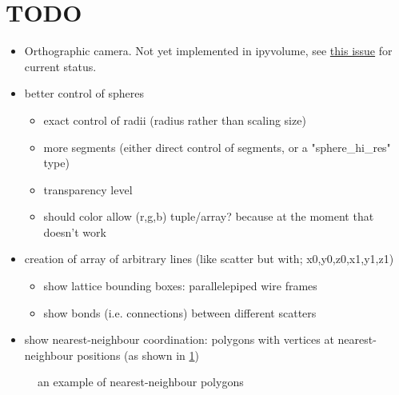 \documentclass[10pt,parskip=half,
	toc=sectionentrywithdots,
	bibliography=totocnumbered,
	captions=tableheading,numbers=noendperiod]{scrartcl}
\providecommand{\tightlist}{%
  \setlength{\itemsep}{0pt}\setlength{\parskip}{0pt}}
\begin{document}
\section{TODO}\label{todo}

\begin{itemize}
\tightlist
\item
  Orthographic camera. Not yet implemented in ipyvolume, see
  \href{https://github.com/maartenbreddels/ipyvolume/issues/31}{this
  issue} for current status.
\item
  better control of spheres

  \begin{itemize}
  \tightlist
  \item
    exact control of radii (radius rather than scaling size)
  \item
    more segments (either direct control of segments, or a
    "sphere\_hi\_res" type)
  \item
    transparency level
  \item
    should color allow (r,g,b) tuple/array? because at the moment that
    doesn't work
  \end{itemize}
\item
  creation of array of arbitrary lines (like scatter but with;
  x0,y0,z0,x1,y1,z1)

  \begin{itemize}
  \tightlist
  \item
    show lattice bounding boxes: parallelepiped wire frames
  \item
    show bonds (i.e. connections) between different scatters
  \end{itemize}
\item
  show nearest-neighbour coordination: polygons with vertices at
  nearest-neighbour positions (as shown in \cref{fig:nnpolygons})
\end{itemize}

\begin{figure}[H]\begin{center}\end{center}\caption{an example of nearest-neighbour polygons}\label{fig:nnpolygons}
    \end{figure}
\end{document}
